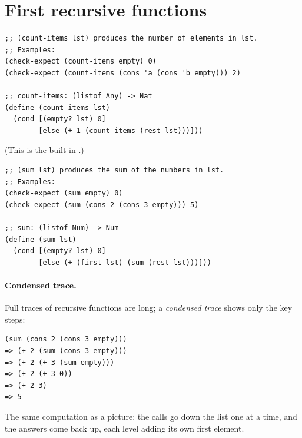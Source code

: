 \section{First recursive functions}

\begin{example}
\begin{lstlisting}[style=racket]
;; (count-items lst) produces the number of elements in lst.
;; Examples:
(check-expect (count-items empty) 0)
(check-expect (count-items (cons 'a (cons 'b empty))) 2)

;; count-items: (listof Any) -> Nat
(define (count-items lst)
  (cond [(empty? lst) 0]
        [else (+ 1 (count-items (rest lst)))]))
\end{lstlisting}
(This is the built-in .)
\end{example}

\begin{example}[Sum]
\begin{lstlisting}[style=racket]
;; (sum lst) produces the sum of the numbers in lst.
;; Examples:
(check-expect (sum empty) 0)
(check-expect (sum (cons 2 (cons 3 empty))) 5)

;; sum: (listof Num) -> Num
(define (sum lst)
  (cond [(empty? lst) 0]
        [else (+ (first lst) (sum (rest lst)))]))
\end{lstlisting}
\end{example}

\paragraph{Condensed trace.} Full traces of recursive functions are long; a
\emph{condensed trace} shows only the key steps:
\begin{lstlisting}[style=racket]
(sum (cons 2 (cons 3 empty)))
=> (+ 2 (sum (cons 3 empty)))
=> (+ 2 (+ 3 (sum empty)))
=> (+ 2 (+ 3 0))
=> (+ 2 3)
=> 5
\end{lstlisting}
The same computation as a picture: the calls go down the list one
 at a time, and the answers come back up, each level adding its
own first element.

\begin{center}
\end{center}

